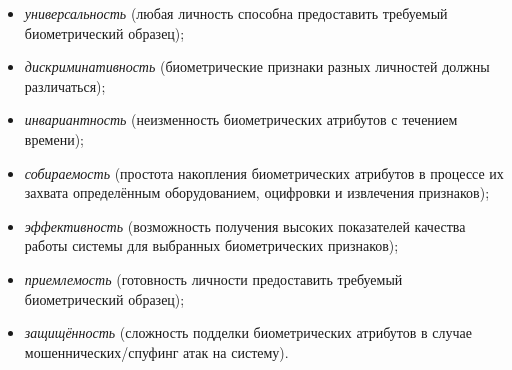 \documentclass[12pt]{book}
\begin{document}
{\begin{itemize}[topsep=1pt] \itemsep0.1em
\item \textit{универсальность} (любая личность способна предоставить требуемый биометрический образец);
\item \textit{дискриминативность} (биометрические признаки разных личностей должны различаться);
\item \textit{инвариантность} (неизменность биометрических атрибутов с течением времени);
\item \textit{собираемость} (простота накопления биометрических атрибутов в процессе их захвата определённым оборудованием, оцифровки и извлечения признаков);
\item \textit{эффективность} (возможность получения высоких показателей качества работы системы для выбранных биометрических признаков);
\item \textit{приемлемость} (готовность личности предоставить требуемый биометрический образец);
\item \textit{защищённость} (сложность подделки биометрических атрибутов в случае мошеннических/спуфинг атак на систему).
\end{itemize}

}
\end{document}
